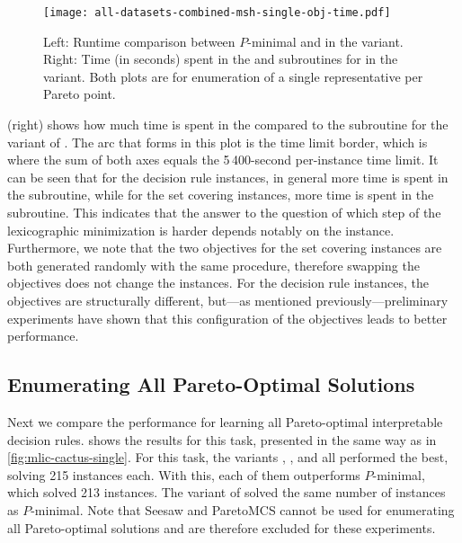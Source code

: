 \begin{figure}
  \centering
  \texttt{[image: all-datasets-combined-msh-single-obj-time.pdf]}
  \caption{Left: Runtime comparison between $P$-minimal and \algname{} in the \msh{} variant.
    Right: Time (in seconds) spent in the \Min{} and \Simpr{} subroutines for \algname{} in the \msh{} variant.
    Both plots are for enumeration of a single representative per Pareto point.
  }\label{fig:combined-msh-single-obj-time}
\end{figure}

 (right) shows how much time is spent in the \Min{} compared to the \Simpr{} subroutine for the \msh{} variant of \algname{}.
The arc that forms in this plot is the time limit border, which is where the sum of both axes equals the 5\,400-second per-instance time limit.
It can be seen that for the decision rule instances, in general more time is spent in the \Simpr{} subroutine, while for the set covering instances, more time is spent in the \Min{} subroutine.
This indicates that the answer to the question of which step of the lexicographic minimization is harder depends notably on the instance.
Furthermore, we note that the two objectives for the set covering instances are both generated randomly with the same procedure, therefore swapping the objectives does not change the instances.
For the decision rule instances, the objectives are structurally different, but---as mentioned previously---preliminary experiments have shown that this configuration of the objectives leads to better performance.

\subsection{Enumerating All Pareto-Optimal Solutions}

Next we compare the performance for learning all Pareto-optimal interpretable decision rules.
 shows the results for this task, presented in the same way as in \cref{fig:mlic-cactus-single}.
For this task, the \algname{} variants \satunsat{}, \unsatsat{}, \msu{} and \msh{} all performed the best, solving 215 instances each.
With this, each of them outperforms $P$-minimal, which solved 213 instances.
The \oll{} variant of \algname{} solved the same number of instances as $P$-minimal.
Note that Seesaw and ParetoMCS cannot be used for enumerating all Pareto-optimal solutions and are therefore excluded for these experiments.

